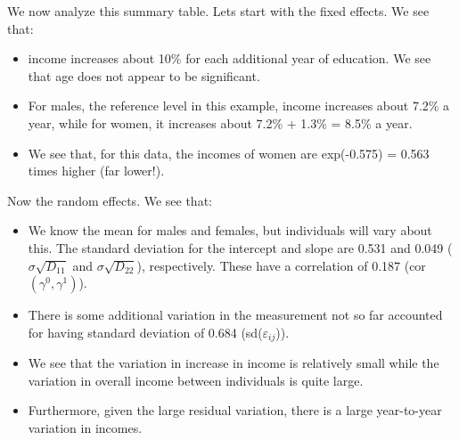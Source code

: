 \documentclass[
  ignorenonframetext,
]{beamer}
\providecommand{\tightlist}{%
  \setlength{\itemsep}{0pt}\setlength{\parskip}{0pt}}
\begin{document}
\begin{frame}{}
\protect\hypertarget{section-28}{}
We now analyze this summary table. Lets start with the fixed effects. We
see that:

\begin{itemize}
\tightlist
\item
  income increases about 10\% for each additional year of education. We
  see that age does not appear to be significant.
\item
  For males, the reference level in this example, income increases about
  7.2\% a year, while for women, it increases about 7.2\% + 1.3\% =
  8.5\% a year.
\item
  We see that, for this data, the incomes of women are exp(-0.575) =
  0.563 times higher (far lower!).
\end{itemize}
\end{frame}

\begin{frame}{}
\protect\hypertarget{section-29}{}
Now the random effects. We see that:

\begin{itemize}
\tightlist
\item
  We know the mean for males and females, but individuals will vary
  about this. The standard deviation for the intercept and slope are
  0.531 and 0.049 (\(\sigma\sqrt{D_{11}}\) and \(\sigma\sqrt{D_{22}}\)),
  respectively. These have a correlation of 0.187
  (cor\((\gamma^0,\gamma^1)\)).
\item
  There is some additional variation in the measurement not so far
  accounted for having standard deviation of 0.684
  (sd(\(\varepsilon_{ij}\))).
\item
  We see that the variation in increase in income is relatively small
  while the variation in overall income between individuals is quite
  large.
\item
  Furthermore, given the large residual variation, there is a large
  year-to-year variation in incomes.
\end{itemize}
\end{frame}
\end{document}
